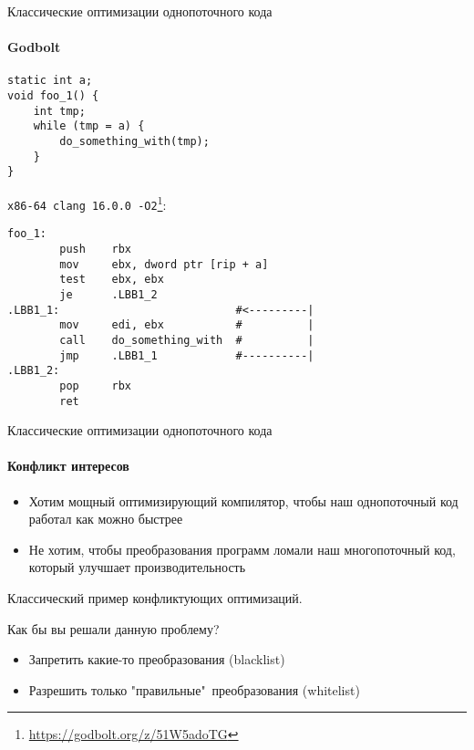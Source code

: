 \begin{frame}[fragile]{Классические оптимизации однопоточного кода}
\framesubtitle{Godbolt}

\begin{adjustbox}{width=\textwidth,height=1cm,keepaspectratio}
\begin{lstlisting}
static int a;
void foo_1() {
    int tmp;
    while (tmp = a) {
        do_something_with(tmp);
    }
}
\end{lstlisting}
\end{adjustbox}

\texttt{x86-64 clang 16.0.0 -O2}\footnote{\url{https://godbolt.org/z/51W5adoTG}}:

\begin{adjustbox}{width=\textwidth,height=2cm,keepaspectratio}
\begin{lstlisting}
foo_1:                                  
        push    rbx
        mov     ebx, dword ptr [rip + a]
        test    ebx, ebx
        je      .LBB1_2
.LBB1_1:                           #<---------|    
        mov     edi, ebx           #          |
        call    do_something_with  #          |
        jmp     .LBB1_1            #----------|
.LBB1_2:
        pop     rbx
        ret
\end{lstlisting}
\end{adjustbox}

\end{frame}


\begin{frame}{Классические оптимизации однопоточного кода}
\framesubtitle{Конфликт интересов}

\begin{itemize}
    \item Хотим мощный оптимизирующий компилятор, чтобы наш однопоточный код работал как можно быстрее
    \item Не хотим, чтобы преобразования программ ломали наш многопоточный код, который улучшает производительность
\end{itemize}

\pause
Классический пример конфликтующих оптимизаций.

\pause
Как бы вы решали данную проблему?

\pause
\begin{itemize}
 \item Запретить какие-то преобразования (blacklist)
 \item Разрешить только "правильные"\ преобразования (whitelist)
\end{itemize}

\end{frame}

